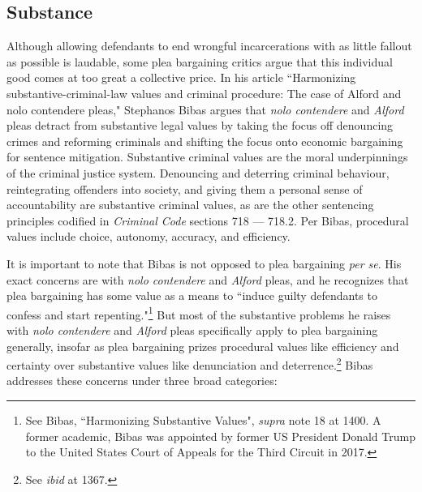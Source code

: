 \subsection{Substance}

Although allowing defendants to end wrongful incarcerations with as little fallout as possible is laudable, some plea bargaining critics argue that this individual good comes at too great a collective price. In his article ``Harmonizing substantive-criminal-law values and criminal procedure: The case of Alford and nolo contendere pleas," Stephanos Bibas argues that \textit{nolo contendere} and \textit{Alford} pleas detract from substantive legal values by taking the focus off denouncing crimes and reforming criminals and shifting the focus onto economic bargaining for sentence mitigation. Substantive criminal values are the moral underpinnings of the criminal justice system. Denouncing and deterring criminal behaviour, reintegrating offenders into society, and giving them a personal sense of accountability are substantive criminal values, as are the other sentencing principles codified in \textit{Criminal Code} sections 718 — 718.2. Per Bibas, procedural values include choice, autonomy, accuracy, and efficiency.

It is important to note that Bibas is not opposed to plea bargaining \textit{per se}. His exact concerns are with \textit{nolo contendere} and \textit{Alford} pleas, and he recognizes that plea bargaining has some value as a means to ``induce guilty defendants to confess and start repenting."\footnote{See Bibas, ``Harmonizing Substantive Values", \textit{supra} note 18 at 1400. A former academic, Bibas was appointed by former US President Donald Trump to the United States Court of Appeals for the Third Circuit in 2017.} But most of the substantive problems he raises with \textit{nolo contendere} and \textit{Alford} pleas specifically apply to plea bargaining generally, insofar as plea bargaining prizes procedural values like efficiency and certainty over substantive values like denunciation and deterrence.\footnote{See \textit{ibid} at 1367.} Bibas addresses these concerns under three broad categories:

